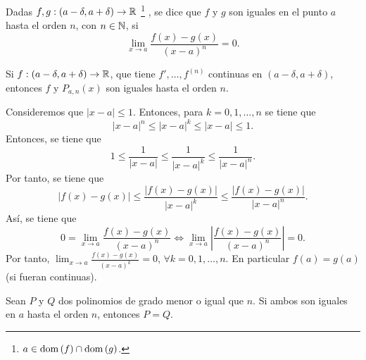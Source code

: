 \begin{fdefinition}[]
\normalfont Dadas $\displaystyle f,g : \left(a - \delta, a+ \delta \right) \to \mathbb{R} $ \footnote{$\displaystyle a \in \operatorname{dom}\left(f\right) \cap \operatorname{dom}\left(g\right) $.} , se dice que $\displaystyle f $ y $\displaystyle g $ son iguales en el punto $\displaystyle a $ hasta el orden $\displaystyle n $, con $\displaystyle n \in \mathbb{N} $, si 
\[\lim_{x \to a}\frac{f\left(x\right)-g\left(x\right)}{\left(x-a\right)^{n}} = 0 .\]
\end{fdefinition}
\begin{eg}
\normalfont Si $\displaystyle f : \left(a-\delta, a + \delta \right)\to \mathbb{R} $, que tiene $\displaystyle f', \ldots, f^{\left(n\right)} $ continuas en $\displaystyle \left(a-\delta, a + \delta \right) $, entonces $\displaystyle f $ y $\displaystyle P_{a,n}\left(x\right) $ son iguales hasta el orden $\displaystyle n $.
\end{eg}
\begin{observation}
\normalfont Consideremos que $\displaystyle \left|x-a\right| \leq 1 $. Entonces, para $\displaystyle k = 0, 1, \ldots, n $ se tiene que 
\[ \left|x-a\right|^{n} \leq \left|x-a\right|^{k} \leq \left|x-a\right| \leq 1 .\]
Entonces, se tiene que
\[ 1 \leq \frac{1}{ \left|x-a\right|} \leq \frac{1}{ \left|x-a\right|^{k}} \leq \frac{1}{ \left|x-a\right|^{n}} .\]
Por tanto, se tiene que
\[ \left|f\left(x\right)-g\left(x\right)\right| \leq \frac{ \left|f\left(x\right)-g\left(x\right)\right|}{ \left|x-a\right|^{k}} \leq \frac{ \left|f\left(x\right)-g\left(x\right)\right|}{ \left|x-a\right|^{n}} .\]
Así, se tiene que
\[0 = \lim_{x \to a}\frac{f\left(x\right)-g\left(x\right)}{ \left(x-a\right)^{n}} \iff \lim_{x \to a} \left|\frac{f\left(x\right)-g\left(x\right)}{\left(x-a\right)^{n}}\right| =0 .\]
Por tanto, $\displaystyle \lim_{x \to a}\frac{f\left(x\right)-g\left(x\right)}{ \left(x-a\right)^{k}} = 0 $, $\displaystyle \forall k = 0, 1, \ldots, n $. En particular $\displaystyle f\left(a\right) = g\left(a\right) $ (si fueran continuas).
\end{observation}
\begin{flema}[]
\normalfont Sean $\displaystyle P $ y $\displaystyle Q $ dos polinomios de grado menor o igual que $\displaystyle n $. Si ambos son iguales en $\displaystyle a $ hasta el orden $\displaystyle n $, entonces $\displaystyle P = Q $.
\end{flema}
